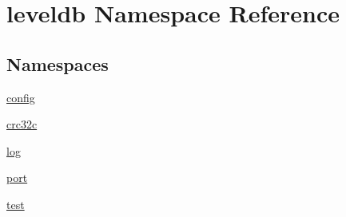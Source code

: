 \hypertarget{namespaceleveldb}{}\section{leveldb Namespace Reference}
\label{namespaceleveldb}
\subsection*{Namespaces}
\begin{DoxyCompactItemize}
\item 
 \hyperlink{namespaceleveldb_1_1config}{config}
\item 
 \hyperlink{namespaceleveldb_1_1crc32c}{crc32c}
\item 
 \hyperlink{namespaceleveldb_1_1log}{log}
\item 
 \hyperlink{namespaceleveldb_1_1port}{port}
\item 
 \hyperlink{namespaceleveldb_1_1test}{test}
\end{DoxyCompactItemize}
